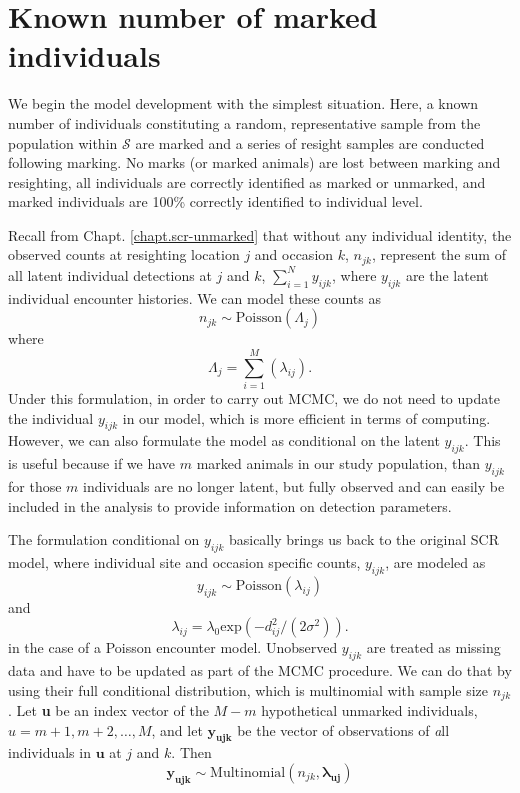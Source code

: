 \section{Known number of marked individuals}

We begin the model development with the simplest situation. Here, a
known number of individuals constituting a random, representative
sample from the population within $\mathcal{S}$ are marked and a
series of resight samples are conducted following marking. No marks
(or marked animals) are lost between marking and resighting, all
individuals are correctly identified as marked or unmarked, and marked
individuals are 100\% correctly identified to individual level.

Recall from Chapt. \ref{chapt.scr-unmarked} that without any individual identity, the observed counts at resighting location
$j$ and occasion $k$, $n_{jk}$, represent the sum of all latent
individual detections at $j$ and $k$,
$\displaystyle\sum\limits_{i=1}^{N} y_{ijk}$, where $y_{ijk}$ are the
latent individual encounter histories.
We can model these counts as
\[
n_{jk} \sim \mbox{Poisson}( \Lambda_{j} )
\]
where
\[
\Lambda_{j} = \sum_{i=1}^{M}( \lambda_{ij} ).
\]
Under this formulation, in order to carry out MCMC,
 we do not need to update the individual
$y_{ijk}$ in our model, which  is more efficient in terms of
computing. However, we can also formulate the model as conditional on
the latent $y_{ijk}$. This is useful because if we have $m$
marked animals in our study population, than $y_{ijk}$ for
those $m$ individuals are no longer latent, but fully observed and can easily be
included in the analysis to provide information on detection parameters.

The formulation conditional on $y_{ijk}$ basically brings us back to
the original SCR model, where individual site and occasion specific
counts, $y_{ijk}$, are modeled as
\[
y_{ijk} \sim \mbox{Poisson}(\lambda _{ij})
\]
and
\[
\lambda _{ij} = \lambda_0  \mbox{exp}(-d_{ij}^2/(2 \sigma^2)).
\]
in the case of a Poisson encounter model.
Unobserved $y_{ijk}$ are treated as missing data and have to be
updated as part of the MCMC procedure. We can do that by using their
full conditional distribution, which is multinomial with sample size
$n_{jk}$.
Let \textbf{u} be an index vector of the $M-m$ hypothetical
unmarked individuals, $u=m+1, m+2, \ldots, M$, and let $\mathbf{y_{ujk}}$ be the vector of observations of {\emph all} individuals in $\mathbf{u}$ at $j$ and $k$. Then
\[
\mathbf{y_{ujk}} \sim \mbox{Multinomial} (n_{jk}, \mathbf{\lambda_{uj}})
\]

